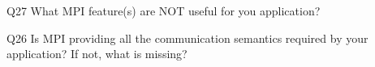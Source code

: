 \begin{description}%
\item{Q27} What MPI feature(s) are NOT useful for you application?%
\item{Q26} Is MPI providing all the communication semantics required by your application? If not, what is missing?%
\end{description}%
